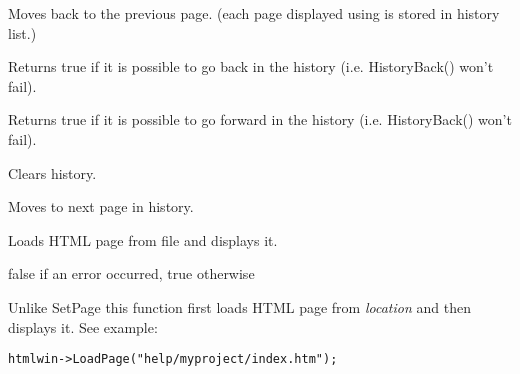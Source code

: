 
Moves back to the previous page. (each page displayed using 
 is stored in history list.)

\label{wxhtmlwindowhistorycanback}


Returns true if it is possible to go back in the history (i.e. HistoryBack()
won't fail).

\label{wxhtmlwindowhistorycanforward}


Returns true if it is possible to go forward in the history (i.e. HistoryBack()
won't fail).


\label{wxhtmlwindowhistoryclear}


Clears history.

\label{wxhtmlwindowhistoryforward}


Moves to next page in history.

\label{wxhtmlwindowloadfile}


Loads HTML page from file and displays it.


false if an error occurred, true otherwise



\label{wxhtmlwindowloadpage}


Unlike SetPage this function first loads HTML page from {\it location} 
and then displays it. See example:

\begin{verbatim}
htmlwin->LoadPage("help/myproject/index.htm");
\end{verbatim}


